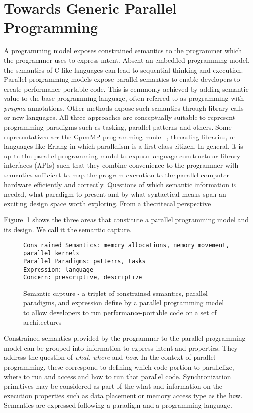 \section{Towards Generic Parallel Programming}\label{chap:background}

A programming model exposes constrained semantics to the programmer which the programmer uses to express intent. Absent an embedded programming model, the semantics of C-like languages can lead to sequential thinking and execution. Parallel programming models expose parallel semantics to enable developers to create performance portable code. This is commonly achieved by adding semantic value to the base programming language, often referred to as programming with \emph{pragma} annotations. Other methods expose such semantics through library calls or new languages. All three approaches are conceptually suitable to represent programming paradigms such as tasking, parallel patterns and others. Some representatives are the OpenMP programming model~\cite{CITEOPENMP}, threading libraries, or languages like Erlang in which parallelism is a first-class citizen. In general, it is up to the parallel programming model to expose language constructs or library interfaces (APIs) such that they combine convenience to the programmer with semantics sufficient to map the program execution to the parallel computer hardware efficiently and correctly. Questions of which semantic information is needed, what paradigm to present and by what syntactical means span an exciting design space worth exploring. From a theoritecal perspective

 Figure~\ref{figSemCapture} shows the three  areas that constitute a parallel programming model and its design. We call it the semantic capture.

\begin{figure}[h]
\begin{Verbatim}[frame=leftline]
Constrained Semantics: memory allocations, memory movement, parallel kernels
Parallel Paradigms: patterns, tasks
Expression: language 
Concern: prescriptive, descriptive
\end{Verbatim}
\caption{Semantic capture - a triplet of constrained semantics, parallel paradigms, and expression define by a parallel programming model to allow developers to run performance-portable code on a set of architectures}
\label{figSemCapture}
\end{figure}

Constrained semantics provided by the programmer to the parallel programming model can be grouped into information to express intent and properties. They address the question of \emph{what}, \emph{where} and \emph{how}. In the context of parallel programming, these correspond to defining which code portion to parallelize, where to run and access and how to run that parallel code. Synchronization primitives may be considered as part of the what and information on the execution properties such as data placement or memory access type as the how. Semantics are expressed following a paradigm and a programming language.

